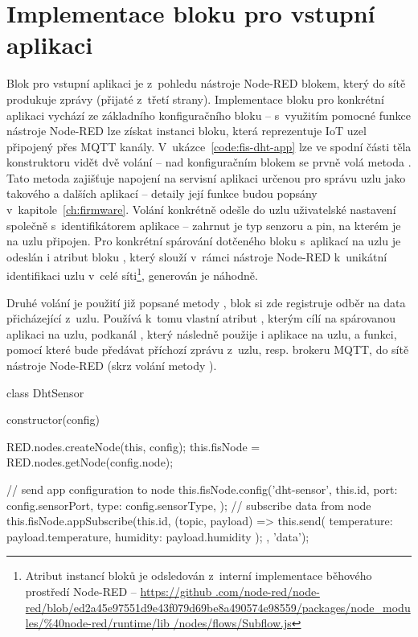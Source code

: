 \section{Implementace bloku pro vstupní aplikaci}\label{sec:implementace-bloku-pro-vstupni-aplikaci}
Blok pro vstupní aplikaci je z~pohledu nástroje Node-RED blokem, který do sítě produkuje zprávy (přijaté z~třetí
strany).
Implementace bloku pro konkrétní aplikaci vychází ze základního konfiguračního bloku -- s~využitím pomocné funkce
nástroje Node-RED \mbox{} lze získat instanci bloku, která reprezentuje IoT uzel připojený přes
MQTT kanály.
V~ukázce~\ref{code:fis-dht-app} lze ve spodní části těla konstruktoru vidět dvě volání -- nad konfiguračním blokem se
prvně volá metoda .
Tato metoda zajišťuje napojení na servisní aplikaci určenou pro správu uzlu jako takového a dalších aplikací --
detaily její funkce budou popsány v~kapitole~\ref{ch:firmware}.
Volání konkrétně odešle do uzlu uživatelské nastavení společně s~identifikátorem aplikace  -- zahrnut
je typ senzoru a pin, na kterém je na uzlu připojen.
Pro konkrétní spárování dotčeného bloku s~aplikací na uzlu je odeslán i atribut bloku , který slouží
v~rámci nástroje Node-RED k~unikátní identifikaci uzlu v~celé síti\footnote{Atribut  instancí bloků je
odsledován z~interní implementace běhového prostředí Node-RED -- \url{https://github
.com/node-red/node-red/blob/ed2a45e97551d9e43f079d69be8a490574e98559/packages/node_modules/\%40node-red/runtime/lib
/nodes/flows/Subflow.js}}, generován je náhodně.

Druhé volání je použití již popsané metody , blok si zde registruje odběr na data přicházející
z~uzlu.
Používá k~tomu vlastní atribut , kterým cílí na spárovanou aplikaci na uzlu, podkanál , který
následně použije i aplikace na uzlu, a funkci, pomocí které bude předávat příchozí zprávu z~uzlu, resp. brokeru MQTT,
do sítě nástroje Node-RED (skrz volání metody ).

\begin{code}[
    language=Javascript,
    label=code:fis-dht-app,
    caption={Detail implementace vstupní aplikace (z~hlediska centrálního uzlu) -- konkrétně se jedná o~aplikaci pro
    senzory typu DHT měřící teplotu a vlhkost okolí. }
]
class DhtSensor {
    constructor(config) {
        RED.nodes.createNode(this, config);
        this.fisNode = RED.nodes.getNode(config.node);

        // send app configuration to node
        this.fisNode.config('dht-sensor', this.id, {
            port: config.sensorPort,
            type: config.sensorType,
        });
        // subscribe data from node
        this.fisNode.appSubscribe(this.id, (topic, payload) => {
            this.send({
                temperature: payload.temperature,
                humidity: payload.humidity
            });
        }, 'data');
    }
}
\end{code}

